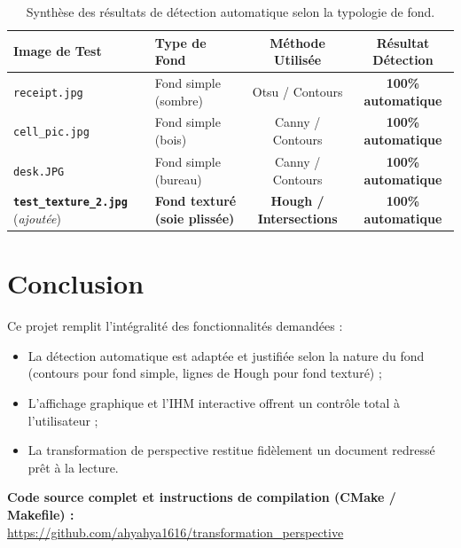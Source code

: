 \documentclass[a4paper,11pt]{article}
\begin{document}
\begin{table}[h!]
\centering
\small
\begin{tabular}{@{}llcc@{}}
\toprule
\textbf{Image de Test} & \textbf{Type de Fond} & \textbf{Méthode Utilisée} & \textbf{Résultat Détection} \\ \midrule
\texttt{receipt.jpg} & Fond simple (sombre) & Otsu / Contours & \textbf{100\% automatique} \\
\texttt{cell\_pic.jpg} & Fond simple (bois) & Canny / Contours & \textbf{100\% automatique} \\
\texttt{desk.JPG} & Fond simple (bureau) & Canny / Contours & \textbf{100\% automatique} \\
\textbf{\texttt{test\_texture\_2.jpg}} (\textit{ajoutée}) & \textbf{Fond texturé (soie plissée)} & \textbf{Hough / Intersections} & \textbf{100\% automatique} \\
\bottomrule
\end{tabular}
\caption{Synthèse des résultats de détection automatique selon la typologie de fond.}
\end{table}

\section{Conclusion}

Ce projet remplit l'intégralité des fonctionnalités demandées :
\begin{itemize}
    \item La détection automatique est adaptée et justifiée selon la nature du fond (contours pour fond simple, lignes de Hough pour fond texturé) ;
    \item L'affichage graphique et l'IHM interactive offrent un contrôle total à l'utilisateur ;
    \item La transformation de perspective restitue fidèlement un document redressé prêt à la lecture.
\end{itemize}

\vspace{0.4cm}
\begin{tcolorbox}[colback=primary!5!white,colframe=primary,arc=2mm,boxrule=0.8pt]
    \centering\small
    \textbf{Code source complet et instructions de compilation (CMake / Makefile) :} \\
    \url{https://github.com/ahyahya1616/transformation_perspective}
\end{tcolorbox}
\end{document}
